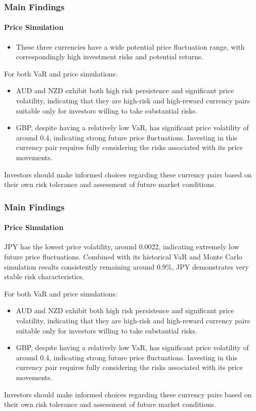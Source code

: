 \documentclass[10pt]{beamer}
\begin{document}
\begin{frame}
\frametitle{Main Findings}
\framesubtitle{Price Simulation}
\begin{itemize}
    \item These three currencies have a wide potential price fluctuation range, with correspondingly high investment risks and potential returns.
\end{itemize}
For both VaR and price simulations:
\begin{itemize}
    \item AUD and NZD exhibit both high risk persistence and significant price volatility, indicating that they are high-risk and high-reward currency pairs suitable only for investors willing to take substantial risks.
    \item GBP, despite having a relatively low VaR, has significant price volatility of around 0.4, indicating strong future price fluctuations. Investing in this currency pair requires fully considering the risks associated with its price movements.
\end{itemize}
Investors should make informed choices regarding these currency pairs based on their own risk tolerance and assessment of future market conditions.
\end{frame}
\begin{frame}
\frametitle{Main Findings}
\framesubtitle{Price Simulation}
JPY has the lowest price volatility, around 0.0022, indicating extremely low future price fluctuations. Combined with its historical VaR and Monte Carlo simulation results consistently remaining around 0.9\%, JPY demonstrates very stable risk characteristics. 

For both VaR and price simulations:
\begin{itemize}
    \item AUD and NZD exhibit both high risk persistence and significant price volatility, indicating that they are high-risk and high-reward currency pairs suitable only for investors willing to take substantial risks.
    \item GBP, despite having a relatively low VaR, has significant price volatility of around 0.4, indicating strong future price fluctuations. Investing in this currency pair requires fully considering the risks associated with its price movements.
\end{itemize}
Investors should make informed choices regarding these currency pairs based on their own risk tolerance and assessment of future market conditions.
\end{frame}
\end{document}
